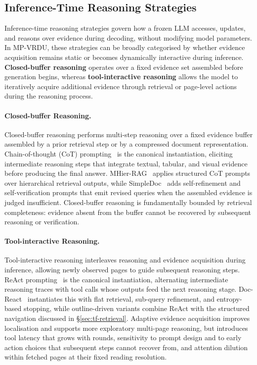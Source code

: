 \documentclass[11pt]{article}
\begin{document}
\subsection{Inference-Time Reasoning Strategies}
\label{sec:tf-reasoning}
Inference-time reasoning strategies govern how a frozen LLM accesses, updates, and reasons over evidence during decoding, without modifying model parameters. In MP-VRDU, these strategies can be broadly categorised by whether evidence acquisition remains static or becomes dynamically interactive during inference. \textbf{Closed-buffer reasoning} operates over a fixed evidence set assembled before generation begins, whereas \textbf{tool-interactive reasoning} allows the model to iteratively acquire additional evidence through retrieval or page-level actions during the reasoning process.

\paragraph{Closed-buffer Reasoning.}
Closed-buffer reasoning performs multi-step reasoning over a fixed evidence buffer assembled by a prior retrieval step or by a compressed document representation. Chain-of-thought (CoT) prompting~\cite{wei2022chain} is the canonical instantiation, eliciting intermediate reasoning steps that integrate textual, tabular, and visual evidence before producing the final answer. MHier-RAG~\cite{gong2025mhier} applies structured CoT prompts over hierarchical retrieval outputs, while SimpleDoc~\cite{jain2025simpledoc} adds self-refinement and self-verification prompts that emit revised queries when the assembled evidence is judged insufficient. Closed-buffer reasoning is fundamentally bounded by retrieval completeness: evidence absent from the buffer cannot be recovered by subsequent reasoning or verification.

\paragraph{Tool-interactive Reasoning.}
Tool-interactive reasoning interleaves reasoning and evidence acquisition during inference, allowing newly observed pages to guide subsequent reasoning steps. ReAct prompting~\cite{yao2022react} is the canonical instantiation, alternating intermediate reasoning traces with tool calls whose outputs feed the next reasoning stage. Doc-React~\cite{wu2025docreact} instantiates this with flat retrieval, sub-query refinement, and entropy-based stopping, while outline-driven variants combine ReAct with the structured navigation discussed in §\ref{sec:tf-retrieval}. Adaptive evidence acquisition improves localisation and supports more exploratory multi-page reasoning, but introduces tool latency that grows with rounds, sensitivity to prompt design and to early action choices that subsequent steps cannot recover from, and attention dilution within fetched pages at their fixed reading resolution.
\end{document}
